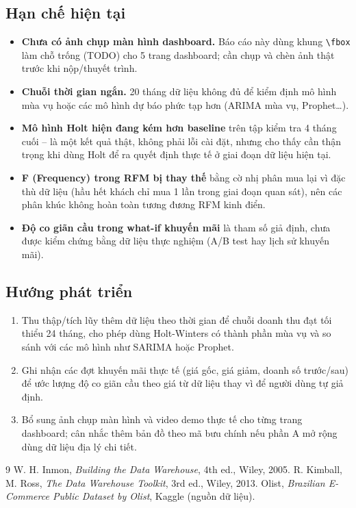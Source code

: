 \documentclass[12pt,a4paper]{article}
\newcommand{\code}[1]{\texttt{\small #1}}
\begin{document}
\subsection{Hạn chế hiện tại}
\begin{itemize}[nosep]
  \item \textbf{Chưa có ảnh chụp màn hình dashboard.} Báo cáo này dùng khung \code{\textbackslash fbox} làm chỗ
        trống (TODO) cho 5 trang dashboard; cần chụp và chèn ảnh thật trước khi nộp/thuyết trình.
  \item \textbf{Chuỗi thời gian ngắn.} 20 tháng dữ liệu không đủ để kiểm định mô hình mùa vụ hoặc các mô hình
        dự báo phức tạp hơn (ARIMA mùa vụ, Prophet\ldots).
  \item \textbf{Mô hình Holt hiện đang kém hơn baseline} trên tập kiểm tra 4 tháng cuối -- là một kết quả thật,
        không phải lỗi cài đặt, nhưng cho thấy cần thận trọng khi dùng Holt để ra quyết định thực tế ở giai
        đoạn dữ liệu hiện tại.
  \item \textbf{F (Frequency) trong RFM bị thay thế} bằng cờ nhị phân mua lại vì đặc thù dữ liệu (hầu hết khách
        chỉ mua 1 lần trong giai đoạn quan sát), nên các phân khúc không hoàn toàn tương đương RFM kinh điển.
  \item \textbf{Độ co giãn cầu trong what-if khuyến mãi} là tham số giả định, chưa được kiểm chứng bằng dữ liệu
        thực nghiệm (A/B test hay lịch sử khuyến mãi).
\end{itemize}

\subsection{Hướng phát triển}
\begin{enumerate}[nosep]
  \item Thu thập/tích lũy thêm dữ liệu theo thời gian để chuỗi doanh thu đạt tối thiểu 24 tháng, cho phép dùng
        Holt-Winters có thành phần mùa vụ và so sánh với các mô hình như SARIMA hoặc Prophet.
  \item Ghi nhận các đợt khuyến mãi thực tế (giá gốc, giá giảm, doanh số trước/sau) để ước lượng độ co giãn cầu
        theo giá từ dữ liệu thay vì để người dùng tự giả định.
  \item Bổ sung ảnh chụp màn hình và video demo thực tế cho từng trang dashboard; cân nhắc thêm bản đồ theo
        mã bưu chính nếu phần A mở rộng dùng dữ liệu địa lý chi tiết.
\end{enumerate}

\begin{thebibliography}{9}
 W. H. Inmon, \emph{Building the Data Warehouse}, 4th ed., Wiley, 2005.
 R. Kimball, M. Ross, \emph{The Data Warehouse Toolkit}, 3rd ed., Wiley, 2013.
 Olist, \emph{Brazilian E-Commerce Public Dataset by Olist}, Kaggle (nguồn dữ liệu).
\end{thebibliography}
\end{document}
